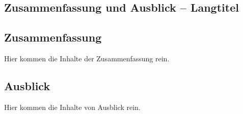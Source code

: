\begin{showConclusion}%
%
\chapter[Zusammenfassung und Ausblick -- Kurztitel für Inhaltsverzeichnis und Kolumnentitel]{Zusammenfassung und Ausblick -- Langtitel}%
\label{chap:Zusammenfassung}
%
%
\section[Zusammenfassung -- Kurztitel für Inhaltsverzeichnis und Kolumnentitel]{Zusammenfassung}%
\label{sec:Conclusion}
%
Hier kommen die Inhalte der Zusammenfassung rein.
%
%

\begin{showOutlook}%
%
\section[Ausblick -- Kurztitel für Inhaltsverzeichnis und Kolumnentitel]{Ausblick}%
\label{sec:Outlook}
%
Hier kommen die Inhalte von Ausblick rein.
%
%
\end{showOutlook}%
%
\end{showConclusion}%